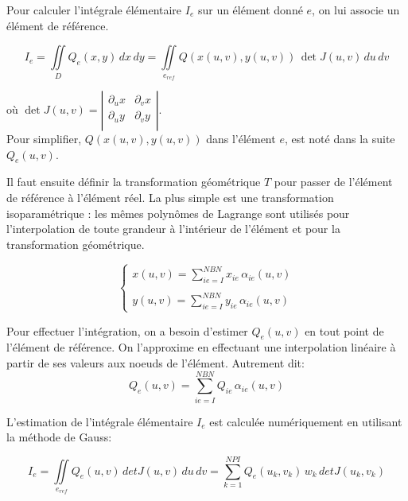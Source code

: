 \documentclass[a4paper, 10pt]{article}
\begin{document}
Pour calculer l'intégrale élémentaire $I_e$ sur un élément donné $e$, on lui associe
 un élément de référence.

\begin{equation}
I_e=\iint\limits_D {Q_e(x,y)\,dx\,dy} = \iint\limits_{e_{ref}} Q(x(u,v), y(u,v))\, \det J(u,v)\, {du}\,  dv
\end{equation}

où
$
\det J(u,v)=
\left|
\begin{array}{rr} \partial_u x  & \partial_v x \\ \partial_u y  & \partial_v y \\ \end{array}
\right|  
$.\\

Pour simplifier, $Q(x(u,v), y(u,v))$ dans l'élément $e$, est noté dans la suite $Q_e(u,v)$.

Il faut ensuite définir la transformation géométrique $T$ pour passer de l'élément de référence à l'élément réel.
La plus simple est une transformation isoparamétrique :  les mêmes polynômes de Lagrange sont utilisés
pour  l'interpolation de toute grandeur à l'intérieur de l'élément  et pour la transformation géométrique.

\begin{equation}
\left\{ {\begin{array}{*{20}{c}}
 x(u,v)=\sum_{ie=I}^{NBN} x_{ie}\, \alpha_{ie}(u,v) \\ \\
y(u,v)=\sum_{ie=I}^{NBN} y_{ie}\, \alpha_{ie}(u,v)  
\end{array}} \right.
\end{equation}

Pour effectuer l'intégration, on a besoin d'estimer $Q_e(u,v)$ en tout point de l'élément de référence. 
On l'approxime en effectuant une interpolation linéaire à partir de ses valeurs aux noeuds de l'élément.
Autrement dit:
\begin{equation}
Q_e(u,v)=\sum_{ie=I}^{NBN} Q_{ie}\, \alpha_{ie}(u,v)
\end{equation}

L'estimation de l'intégrale élémentaire $I_e$ est calculée numériquement en utilisant la
méthode de Gauss:

\begin{equation}
I_e=\iint\limits_{e_{ref}} Q_e(u,v)\, detJ(u,v)\,  du \,  dv= \sum_{k=1}^{NPI} Q_e(u_k, v_k)\, w_k \, detJ(u_k, v_k)
\end{equation}
\end{document}
